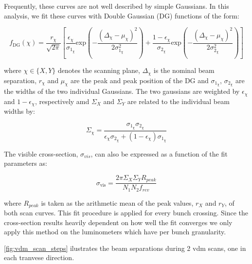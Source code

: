 Frequently, these curves are not well described by simple Gaussians. In this analysis, we fit these curves with Double Gaussian (DG) functions of the form:

\begin{equation}
    f_{\text{DG}}(\chi) = 
    \frac{r_{\chi}}{\sqrt{2\pi}} 
    \left[ 
        \frac{\epsilon_{\chi}}{\sigma_{1_{\chi}}} \text{exp} \left( -\frac{\left( \Delta_{\chi} - \mu_{\chi} \right)^2}{2\sigma^2_{1_{\chi}}} \right) +
        \frac{1 - \epsilon_{\chi}}{\sigma_{2_{\chi}}} \text{exp} \left( -\frac{\left( \Delta_{\chi} - \mu_{\chi} \right)^2}{2\sigma^2_{2_{\chi}}} \right)
    \right]
    \label{eq:double_gaussian_model}
\end{equation}

where $\chi \in \{X, Y\}$ denotes the scanning plane, $\Delta_{\chi}$ is the nominal beam separation, $r_{\chi}$ and $\mu_{\chi}$ are the peak and peak position of the DG and $\sigma_{1_{\chi}}$, $\sigma_{2_{\chi}}$ are the widths of the two individual Gaussians. The two gaussians are weighted by $\epsilon_{\chi}$ and $1 - \epsilon_{\chi}$, respectively amd $\Sigma_{X}$ and $\Sigma_{Y}$ are related to the individual beam widths by: 

\begin{equation}
    \Sigma_{\chi} = \frac{\sigma_{1_{\chi}}\sigma_{2_{\chi}}}{\epsilon_{\chi}\sigma_{2_{\chi}} + \left( 1 - \epsilon_{\chi}\right) \sigma_{1_{\chi}}}
\end{equation}

The visible cross-section, $\sigma_{vis}$, can also be expressed as a function of the fit parameters as:

\begin{equation}
    \sigma_{\mathrm{vis}} =  \frac{2\pi \Sigma_{X} \Sigma_{Y} R_{peak}}{N_1 N_2 f_{rev}}
    \label{eq:calibration_from_fit_parameters}
\end{equation}

where $R_{peak}$ is taken as the arithmetic mean of the peak values, $r_X$ and $r_Y$, of both scan curves. This fit procedure is applied for every bunch crossing. Since the cross-section results heavily dependent on how well the fit converges we only apply this method on the luminometers which have per bunch granularity.

\autoref{fig:vdm_scan_steps} ilustrates the beam separations during 2 vdm scans, one in each tranvese direction.

